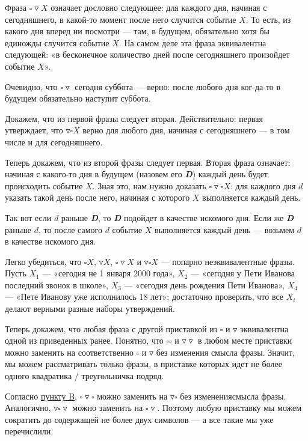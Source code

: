 ﻿
\def\sq{\square}
\def\td{\triangledown}

\begin{itemize}
\itA Фраза $\sq\td X$ означает дословно следующее: для каждого дня, начиная с сегодняшнего, в какой-то момент после него случится событие $X$. То есть, из какого дня вперед ни посмотри — там, в будущем, обязательно хотя бы единожды случится событие $X$. На самом деле эта фраза эквивалентна следующей: «в бесконечное количество дней после сегодняшнего произойдет событие $X$».

Очевидно, что $\sq\td \text{ сегодня суббота}$ — верно: после любого дня ког-\linebreak да-то в будущем обязательно наступит суббота.

\itB \label{logicb} Докажем, что из первой фразы следует вторая. Действительно: первая утверждает, что $\td\sq X$ верно для любого дня, начиная с сегодняшнего — в том числе и для сегодняшнего.

Теперь докажем, что из второй фразы следует первая. Вторая фраза означает: начиная с какого-то дня в будущем (назовем его {\itshape\bfseries D}) каждый день будет происходить событие $X$. Зная это, нам нужно доказать $\sq\td\sq X$: для каждого дня $d$ указать такой день после него, начиная с которого $X$ выполняется каждый день.

Так вот если $d$ раньше {\itshape\bfseries D}, то {\itshape\bfseries D} подойдет в качестве искомого дня. Если же {\itshape\bfseries D} раньше $d$, то после самого $d$ событие $X$ выполняется каждый день — возьмем $d$ в качестве искомого дня.

\itC Легко убедиться, что $\sq X$, $\td X$, $\sq\td X$ и $\td\sq X$ — попарно неэквивалентные фразы. Пусть $X_1$ — «сегодня не 1 января 2000 года», $X_2$ — «сегодня у Пети Иванова последний звонок в школе», $X_3$ — «сегодня день рождения Пети Иванова», $X_4$ — «Пете Иванову уже исполнилось 18 лет»; достаточно проверить, что все $X_i$ делают верными разные наборы утверждений.

Теперь докажем, что любая фраза с другой приставкой из $\sq$ и $\td$ эквивалентна одной из приведенных ранее. Понятно, что $\sq\sq$ и $\td\td$ в любом месте приставки можно заменить на соответственно $\sq$ и $\td$ без изменения смысла фразы. Значит, мы можем рассматривать только фразы, в приставке которых идет не более одного квадратика / треугольничка подряд.

Согласно \hyperref[logicb]{пункту B}, $\sq\td\sq$ можно заменить на $\td\sq$ без изменения\linebreak смысла фразы. Аналогично, $\td\sq\td$ можно заменить на $\sq\td$. Поэтому любую приставку мы можем сократить до содержащей не более двух символов — а все такие мы уже перечислили.

\end{itemize}
